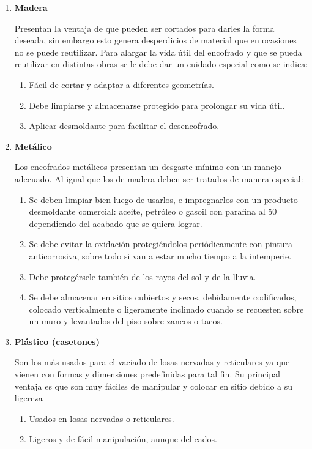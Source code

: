 \documentclass[12pt]{article}
\begin{document}
	\begin{enumerate}
		\item \textbf{Madera}
		
		Presentan la ventaja de que pueden ser cortados para
		darles la forma deseada, sin embargo esto genera desperdicios de material que en
		ocasiones no se puede reutilizar. Para alargar la vida útil del encofrado y que se
		pueda reutilizar en distintas obras se le debe dar un cuidado especial como se
		indica:
		
		\begin{enumerate}[label=\alph*)]
			\item Fácil de cortar y adaptar a diferentes geometrías.
			\item Debe limpiarse y almacenarse protegido para prolongar su vida útil.
			\item Aplicar desmoldante para facilitar el desencofrado.
		\end{enumerate}
		\item \textbf{Metálico}
	
		Los encofrados metálicos presentan un desgaste mínimo con un manejo
		adecuado. Al igual que los de madera deben ser tratados de manera especial:
		
		
		\begin{enumerate}[label=\alph*)]
			\item 
			Se deben limpiar bien luego de usarlos, e impregnarlos con un producto
			desmoldante comercial: aceite, petróleo o gasoil con parafina al 50%
			dependiendo del acabado que se quiera lograr.
			\item 
			Se debe evitar la oxidación protegiéndolos periódicamente con pintura
			anticorrosiva, sobre todo si van a estar mucho tiempo a la intemperie.
			
			\item 
			Debe protegérsele también de los rayos del sol y de la lluvia.
			
			\item 
			Se debe almacenar en sitios cubiertos y secos, debidamente codificados,
			colocado verticalmente o ligeramente inclinado cuando se recuesten sobre
			un muro y levantados del piso sobre zancos o tacos.
			
		\end{enumerate}
		
		
		\item \textbf{Plástico (casetones)}
		
		Son los más usados para el vaciado de losas nervadas y
		reticulares ya que vienen con formas y dimensiones predefinidas para tal fin. Su
		principal ventaja es que son muy fáciles de manipular y colocar en sitio debido a
		su ligereza
		
		\begin{enumerate}[label=\alph*)]
			\item Usados en losas nervadas o reticulares.
			\item Ligeros y de fácil manipulación, aunque delicados.
		\end{enumerate}
	\end{enumerate}
	
\end{document}
